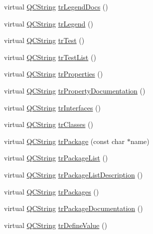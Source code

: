 \begin{DoxyCompactItemize}
\item 
virtual \hyperlink{class_q_c_string}{Q\+C\+String} \hyperlink{class_translator_arabic_a8e0d765f0f36ce753781268166668e5e}{tr\+Legend\+Docs} ()
\item 
virtual \hyperlink{class_q_c_string}{Q\+C\+String} \hyperlink{class_translator_arabic_abb8560f05098200f708e49b7f379085b}{tr\+Legend} ()
\item 
virtual \hyperlink{class_q_c_string}{Q\+C\+String} \hyperlink{class_translator_arabic_a9f87dd5731ec1d604216233455f439ab}{tr\+Test} ()
\item 
virtual \hyperlink{class_q_c_string}{Q\+C\+String} \hyperlink{class_translator_arabic_a7e8caff2ea908b88b8c90650764fa4d0}{tr\+Test\+List} ()
\item 
virtual \hyperlink{class_q_c_string}{Q\+C\+String} \hyperlink{class_translator_arabic_afbabf4ac8a1961d481c1bf31bcce97ae}{tr\+Properties} ()
\item 
virtual \hyperlink{class_q_c_string}{Q\+C\+String} \hyperlink{class_translator_arabic_ab071310a2ae9e45b495d83fd4eb44f9e}{tr\+Property\+Documentation} ()
\item 
virtual \hyperlink{class_q_c_string}{Q\+C\+String} \hyperlink{class_translator_arabic_a4ecad397cc77436ee6922966d5a2b741}{tr\+Interfaces} ()
\item 
virtual \hyperlink{class_q_c_string}{Q\+C\+String} \hyperlink{class_translator_arabic_afb6f5a575aa2fa43e443a44a1c63f01d}{tr\+Classes} ()
\item 
virtual \hyperlink{class_q_c_string}{Q\+C\+String} \hyperlink{class_translator_arabic_a58878dd256679c4a9a9355d134e15f41}{tr\+Package} (const char $\ast$name)
\item 
virtual \hyperlink{class_q_c_string}{Q\+C\+String} \hyperlink{class_translator_arabic_a265f6f48fad089ea092ab98682e0d842}{tr\+Package\+List} ()
\item 
virtual \hyperlink{class_q_c_string}{Q\+C\+String} \hyperlink{class_translator_arabic_ab1192d198f1a4bd72319034848f9bb08}{tr\+Package\+List\+Description} ()
\item 
virtual \hyperlink{class_q_c_string}{Q\+C\+String} \hyperlink{class_translator_arabic_a072aa43f25aa0fbff418fcc8a777e769}{tr\+Packages} ()
\item 
virtual \hyperlink{class_q_c_string}{Q\+C\+String} \hyperlink{class_translator_arabic_a06b71185bea0e8511121b5274d5e45be}{tr\+Package\+Documentation} ()
\item 
virtual \hyperlink{class_q_c_string}{Q\+C\+String} \hyperlink{class_translator_arabic_a69d32547d8c7f9c08fdd5414adb2af57}{tr\+Define\+Value} ()

\end{DoxyCompactItemize}
